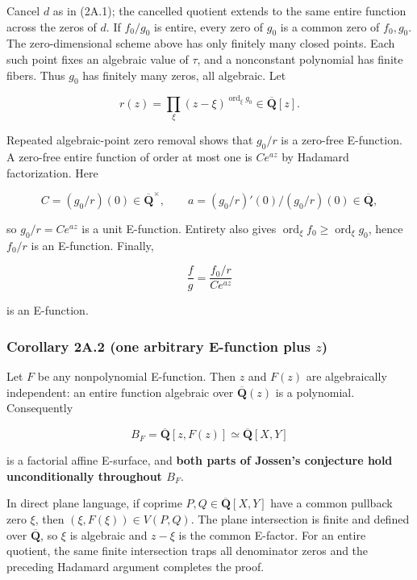 \documentclass[11pt]{article}
\theoremstyle{keio}
\theoremstyle{definition}
\theoremstyle{remark}
\begin{document}
Cancel \(d\) as in (2A.1); the cancelled quotient extends to the same entire
function across the zeros of \(d\). If \(f_0/g_0\) is entire, every zero of \(g_0\)
is a common zero of \(f_0,g_0\). The zero-dimensional scheme above has only
finitely many closed points. Each such point fixes an algebraic value of
\(\tau\), and a nonconstant polynomial has finite fibers. Thus \(g_0\) has
finitely many zeros, all algebraic. Let

\[
  r(z)=\prod_\xi(z-\xi)^{\operatorname{ord}_\xi g_0}
  \in\overline{\mathbf Q}[z].                               \tag{J-2A.2}
\]

Repeated algebraic-point zero removal shows that \(g_0/r\) is a zero-free
E-function. A zero-free entire function of order at most one is
\(Ce^{az}\) by Hadamard factorization. Here

\[
  C=(g_0/r)(0)\in\overline{\mathbf Q}^{\times},\qquad
  a=(g_0/r)'(0)/(g_0/r)(0)\in\overline{\mathbf Q},
\]

so \(g_0/r=Ce^{az}\) is a unit E-function. Entirety also gives
\(\operatorname{ord}_\xi f_0\ge\operatorname{ord}_\xi g_0\), hence
\(f_0/r\) is an E-function. Finally,

\[
  \frac fg=\frac{f_0/r}{Ce^{az}}
\]

is an E-function.

\subsubsection{\texorpdfstring{Corollary 2A.2 (one arbitrary E-function plus \(z\))}{Corollary 2A.2 (one arbitrary E-function plus z)}}

Let \(F\) be any nonpolynomial E-function. Then \(z\) and \(F(z)\) are
algebraically independent: an entire function algebraic over
\(\overline{\mathbf Q}(z)\) is a polynomial. Consequently

\[
  B_F=\overline{\mathbf Q}[z,F(z)]
  \simeq\overline{\mathbf Q}[X,Y]
\]

is a factorial affine E-surface, and \textbf{both parts of Jossen's conjecture hold
unconditionally throughout \(B_F\)}.

In direct plane language, if coprime \(P,Q\in\overline{\mathbf Q}[X,Y]\)
have a common pullback zero \(\xi\), then
\((\xi,F(\xi))\in V(P,Q)\). The plane intersection is finite and defined
over \(\overline{\mathbf Q}\), so \(\xi\) is algebraic and \(z-\xi\) is the
common E-factor. For an entire quotient, the same finite intersection traps
all denominator zeros and the preceding Hadamard argument completes the
proof.
\end{document}
